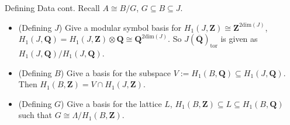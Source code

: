 \documentclass{beamer}
\newcommand{\QQ}{\mathbf{Q}}
\newcommand{\QQbar}{\overline{\mathbf{Q}}}
\newcommand{\ZZ}{\mathbf{Z}}
\renewcommand{\ZZ}{\mathbf{Z}}
\newcommand{\tor}{\mathrm{tor}}
\begin{document}



\begin{frame}{Defining Data cont.}
    Recall $A\cong B/G$, $G\subseteq B \subseteq J$.
    \begin{itemize}
        \item
            (Defining $J$) Give a modular symbol basis for $H_1(J, \ZZ)\cong
            \ZZ^{2\mathrm{dim}(J)}$, $H_1(J, \QQ) = H_1(J, \ZZ)\otimes
            \QQ\cong \QQ^{2\mathrm{dim}(J)}$. So $J(\QQbar)_\tor$ is given as
            $H_1(J, \QQ)/H_1(J, \QQ)$.
            \pause
        \item
            (Defining $B$) Give a basis for the subspace $V:=H_1(B,
            \QQ)\subseteq H_1(J, \QQ)$. Then $H_1(B, \ZZ)=V\cap H_1(J, \ZZ)$.
            \pause
        \item
            (Defining $G$) Give a basis for the lattice $L$, $H_1(B, \ZZ)
            \subseteq L \subseteq H_1(B, \QQ)$ such that $G\cong \Lambda/H_1(B,
            \ZZ)$.
    \end{itemize}
\end{frame}
\end{document}

